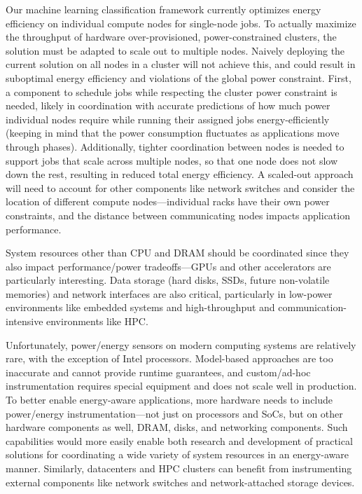 Our machine learning classification framework currently optimizes energy efficiency on individual compute nodes for single-node jobs.
To actually maximize the throughput of hardware over-provisioned, power-constrained clusters, the solution must be adapted to scale out to multiple nodes.
Naively deploying the current solution on all nodes in a cluster will not achieve this, and could result in suboptimal energy efficiency and violations of the global power constraint.
First, a component to schedule jobs while respecting the cluster power constraint is needed, likely in coordination with accurate predictions of how much power individual nodes require while running their assigned jobs energy-efficiently (keeping in mind that the power consumption fluctuates as applications move through phases).
Additionally, tighter coordination between nodes is needed to support jobs that scale across multiple nodes, so that one node does not slow down the rest, resulting in reduced total energy efficiency.
A scaled-out approach will need to account for other components like network switches and consider the location of different compute nodes---individual racks have their own power constraints, and the distance between communicating nodes impacts application performance.

System resources other than CPU and DRAM should be coordinated since they also impact performance/power tradeoffs---GPUs and other accelerators are particularly interesting.
Data storage (\eg hard disks, SSDs, future non-volatile memories) and network interfaces are also critical, particularly in low-power environments like embedded systems and high-throughput and communication-intensive environments like HPC.

Unfortunately, power/energy sensors on modern computing systems are relatively rare, with the exception of Intel processors.
Model-based approaches are too inaccurate and cannot provide runtime guarantees, and custom/ad-hoc instrumentation requires special equipment and does not scale well in production.
To better enable energy-aware applications, more hardware needs to include power/energy instrumentation---not just on processors and SoCs, but on other hardware components as well, \eg DRAM, disks, and networking components.
Such capabilities would more easily enable both research and development of practical solutions for coordinating a wide variety of system resources in an energy-aware manner.
Similarly, datacenters and HPC clusters can benefit from instrumenting external components like network switches and network-attached storage devices.

